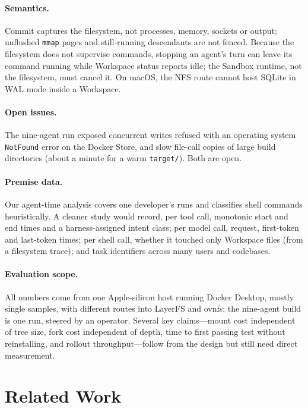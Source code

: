 \documentclass[letterpaper,twocolumn,10pt]{article}
\newcommand{\sys}{LayerFS}
\newcommand{\ws}{Workspace}
\begin{document}
\paragraph{Semantics.} Commit captures the filesystem, not processes,
memory, sockets or output; unflushed \texttt{mmap} pages and still-running
descendants are not fenced. Because the filesystem does not supervise
commands, stopping an agent's turn can leave its command running while \ws{}
status reports idle; the Sandbox runtime, not the filesystem, must cancel
it. On macOS, the NFS route cannot host SQLite in WAL mode inside a \ws{}.

\paragraph{Open issues.} The nine-agent run exposed concurrent writes
refused with an operating system \texttt{NotFound} error on the Docker
Store, and slow file-call copies of large build directories (about a minute
for a warm \texttt{target/}). Both are open.

\paragraph{Premise data.} Our agent-time analysis covers one developer's
runs and classifies shell commands heuristically. A cleaner study would
record, per tool call, monotonic start and end times and a harness-assigned
intent class; per model call, request, first-token and last-token times;
per shell call, whether it touched only \ws{} files (from a filesystem
trace); and task identifiers across many users and codebases.

\paragraph{Evaluation scope.} All numbers come from one Apple-silicon host
running Docker Desktop, mostly single samples, with different routes into
\sys{} and ovnfs; the nine-agent build is one run, steered by an operator. Several key claims---mount cost independent of tree size,
fork cost independent of depth, time to first passing test without
reinstalling, and rollout throughput---follow from the design but still
need direct measurement.

\section{Related Work}
\end{document}
